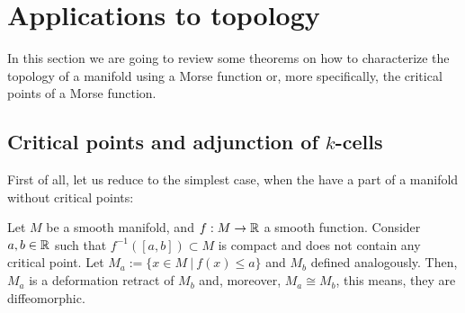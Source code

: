 \section{Applications to topology} \label{section:morse_topology}

In this section we are going to review some theorems on how to characterize the topology of a manifold using a Morse function or, more specifically, the critical points of a Morse function.

\subsection{Critical points and adjunction of $k$-cells}

First of all, let us reduce to the simplest case, when the have a part of a manifold without critical points:

\begin{theo}
Let $M$ be a smooth manifold, and $f : M \rightarrow \mathbb{R}$ a smooth function. Consider $a, b \in \mathbb{R}$ such that $f^{-1}([a,b]) \subset M$ is compact and does not contain any critical point. Let $M_a := \{x \in M \ | \ f(x) \leq a\}$ and $M_b$ defined analogously. Then, $M_a$ is a deformation retract of $M_b$ and, moreover, $M_a \cong M_b$, this means, they are diffeomorphic.
\end{theo}

